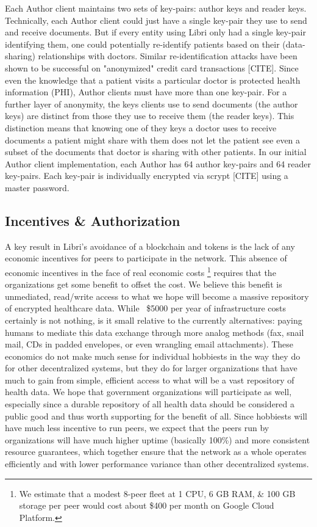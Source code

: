 \documentclass[10pt]{article}
\begin{document}
Each Author client maintains two sets of key-pairs: author keys and reader keys. Technically, each Author client could just have a single key-pair they use to send and receive documents. But if every entity using Libri only had a single key-pair identifying them, one could potentially re-identify patients based on their (data-sharing) relationships with doctors. Similar re-identification attacks have been shown to be successful on "anonymized" credit card transactions [CITE]. Since even the knowledge that a patient visits a particular doctor is protected health information (PHI), Author clients must have more than one key-pair. For a further layer of anonymity, the keys clients use to send documents (the author keys) are distinct from those they use to receive them (the reader keys). This distinction means that knowing one of they keys a doctor uses to receive documents a patient might share with them does not let the patient see even a subset of the documents that doctor is sharing with other patients. In our initial Author client implementation, each Author has 64 author key-pairs and 64 reader key-pairs. Each key-pair is individually encrypted via scrypt [CITE] using a master password.

\subsection{Incentives \& Authorization}
\label{sec:Incentives}

A key result in Libri's avoidance of a blockchain and tokens is the lack of any economic incentives for peers to participate in the network. This absence of economic incentives in the face of real economic costs \footnote{We estimate that a modest 8-peer fleet at 1 CPU, 6 GB RAM, \& 100 GB storage per peer would cost about \$400 per month on Google Cloud Platform.} requires that the organizations get some benefit to offset the cost. We believe this benefit is unmediated, read/write access to what we hope will become a massive repository of encrypted healthcare data. While ~\$5000 per year of infrastructure costs certainly is not nothing, is it small relative to the currently alternatives: paying humans to mediate this data exchange through more analog methods (fax, snail mail, CDs in padded envelopes, or even wrangling email attachments). These economics do not make much sense for individual hobbiests in the way they do for other decentralized systems, but they do for larger organizations that have much to gain from simple, efficient access to what will be a vast repository of health data. We hope that government organizations will participate as well, especially since a durable repository of all health data should be considered a public good and thus worth supporting for the benefit of all. Since hobbiests will have much less incentive to run peers, we expect that the peers run by organizations will have much higher uptime (basically 100\%) and more consistent resource guarantees, which together ensure that the network as a whole operates efficiently and with lower performance variance than other decentralized systems.
\end{document}
